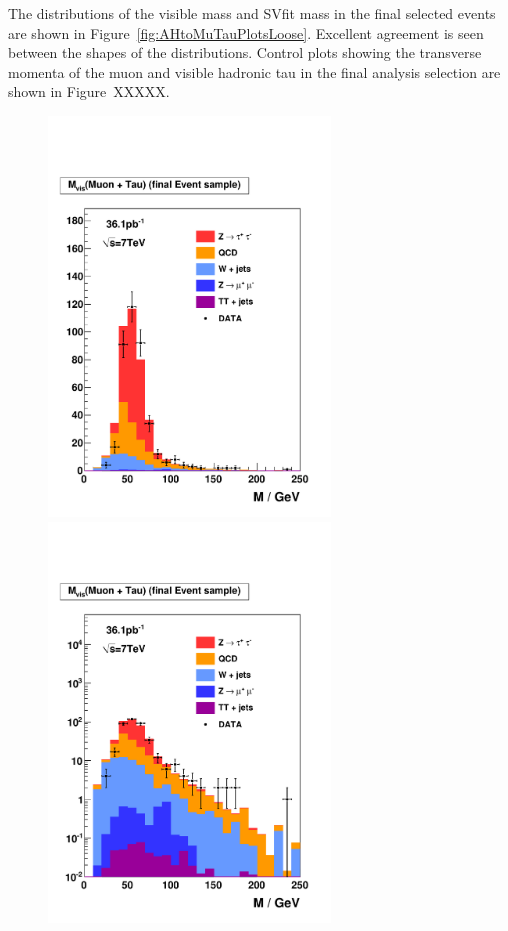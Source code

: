 The distributions of the visible mass and SVfit mass in the final selected
events are shown in Figure~\ref{fig:AHtoMuTauPlotsLoose}.  Excellent
agreement is seen between the shapes of the distributions.   Control plots
showing the transverse
momenta of the muon and visible hadronic tau in the final analysis selection are
shown in  Figure~XXXXX.
%
\begin{figure}[t]
\begin{center}
\includegraphics*[width=75mm]{results_chapter/figures/results_loose/plotAHtoMuTauOS_woBtag_finalSamplePlots_mVisible_linear.pdf}
\includegraphics*[width=75mm]{results_chapter/figures/results_loose/plotAHtoMuTauOS_woBtag_finalSamplePlots_mVisible_log.pdf}

\end{center}
\end{figure}

